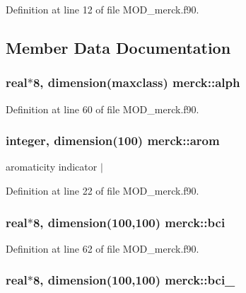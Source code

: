 Definition at line 12 of file M\-O\-D\-\_\-merck.\-f90.



\subsection{Member Data Documentation}
\hypertarget{classmerck_a294bc9b22bc804b6c906db9ca65dc054}{
\subsubsection[{alph}]{\setlength{\rightskip}{0pt plus 5cm}real$\ast$8, dimension(maxclass) merck\-::alph}}\label{classmerck_a294bc9b22bc804b6c906db9ca65dc054}


Definition at line 60 of file M\-O\-D\-\_\-merck.\-f90.

\hypertarget{classmerck_aeaa92f814f841125913ead1e6f367fed}{
\subsubsection[{arom}]{\setlength{\rightskip}{0pt plus 5cm}integer, dimension(100) merck\-::arom}}\label{classmerck_aeaa92f814f841125913ead1e6f367fed}


aromaticity indicator $|$ 



Definition at line 22 of file M\-O\-D\-\_\-merck.\-f90.

\hypertarget{classmerck_a5ab2ebf1fd4e8497680601f27f9dfc4f}{
\subsubsection[{bci}]{\setlength{\rightskip}{0pt plus 5cm}real$\ast$8, dimension(100,100) merck\-::bci}}\label{classmerck_a5ab2ebf1fd4e8497680601f27f9dfc4f}


Definition at line 62 of file M\-O\-D\-\_\-merck.\-f90.

\hypertarget{classmerck_a4ec458165a6cf8835583b406de9a3dae}{
\subsubsection[{bci\-\_\-1}]{\setlength{\rightskip}{0pt plus 5cm}real$\ast$8, dimension(100,100) merck\-::bci\-\_}}\label{classmerck_a4ec458165a6cf8835583b406de9a3dae}


